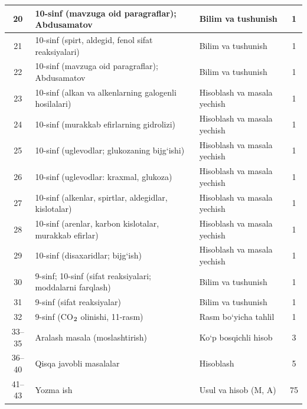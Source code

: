 \documentclass[11pt,a4paper]{article}
\renewcommand{\textsubscript}[1]{\ensuremath{_{\text{\fontsize{8}{8}\selectfont #1}}}}
\begin{document}
{\begin{longtable}{|c|p{7.2cm}|p{5.4cm}|c|}
20 & 10-sinf (mavzuga oid paragraflar); Abdusamatov & Bilim va tushunish & 1\\\hline
21 & 10-sinf (spirt, aldegid, fenol sifat reaksiyalari) & Bilim va tushunish & 1\\\hline
22 & 10-sinf (mavzuga oid paragraflar); Abdusamatov & Bilim va tushunish & 1\\\hline
23 & 10-sinf (alkan va alkenlarning galogenli hosilalari) & Hisoblash va masala yechish & 1\\\hline
24 & 10-sinf (murakkab efirlarning gidrolizi) & Hisoblash va masala yechish & 1\\\hline
25 & 10-sinf (uglevodlar; glukozaning bijg`ishi) & Hisoblash va masala yechish & 1\\\hline
26 & 10-sinf (uglevodlar: kraxmal, glukoza) & Hisoblash va masala yechish & 1\\\hline
27 & 10-sinf (alkenlar, spirtlar, aldegidlar, kislotalar) & Hisoblash va masala yechish & 1\\\hline
28 & 10-sinf (arenlar, karbon kislotalar, murakkab efirlar) & Hisoblash va masala yechish & 1\\\hline
29 & 10-sinf (disaxaridlar; bijg`ish) & Hisoblash va masala yechish & 1\\\hline
30 & 9-sinf; 10-sinf (sifat reaksiyalari; moddalarni farqlash) & Bilim va tushunish & 1\\\hline
31 & 9-sinf (sifat reaksiyalar) & Bilim va tushunish & 1\\\hline
32 & 9-sinf (CO\textsubscript{2} olinishi, 11-rasm) & Rasm bo`yicha tahlil & 1\\\hline
33--35 & Aralash masala (moslashtirish) & Ko`p bosqichli hisob & 3\\\hline
36--40 & Qisqa javobli masalalar & Hisoblash & 5\\\hline
41--43 & Yozma ish & Usul va hisob (M, A) & 75\\\hline
\end{longtable}}
\end{document}
